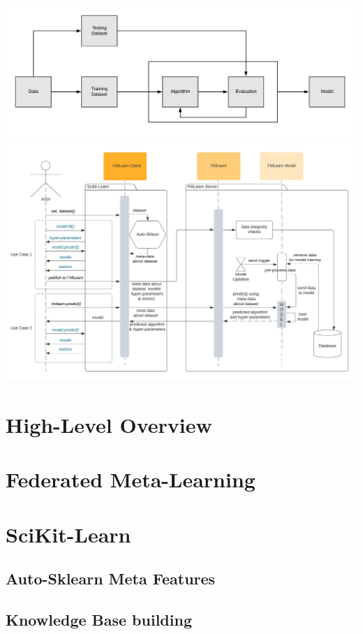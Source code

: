 \includegraphics{images/ML Workflow.jpeg}
\includegraphics{images/Sequence Diagram.jpeg}

\section{High-Level Overview}

\section{Federated Meta-Learning}
\label{federated-meta-learning}

\section{SciKit-Learn}
\label{scikit-learn}

\subsection{Auto-Sklearn Meta Features}
\label{auto-sklearn}

\subsection{Knowledge Base building}
\label{knowledge-base}

